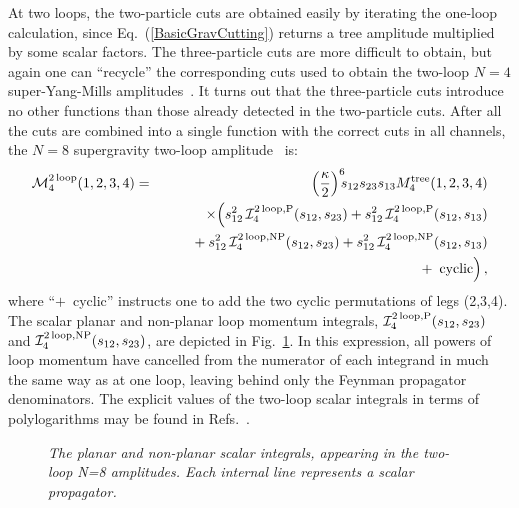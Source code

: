 \documentclass[12pt]{livrev}
\begin{document}
At two loops, the two-particle cuts are obtained easily by
iterating the one-loop calculation, since Eq.~(\ref{BasicGravCutting})
returns a tree amplitude multiplied by some scalar factors. The
three-particle cuts are more difficult to obtain, but again one can
``recycle'' the corresponding cuts used to obtain the two-loop $N=4$
super-Yang-Mills amplitudes~\cite{BRY}.  It turns out that the
three-particle cuts introduce no other functions than those already
detected in the two-particle cuts.  After all the cuts are combined into a
single function with the correct cuts in all channels, the $N=8$
supergravity two-loop amplitude~\cite{BDDPR} is:
%
\begin{eqnarray}
{\cal M}_4^{{\rm 2\,loop}}(1,2,3,4) & = &
  \Bigl({\kappa \over 2} \Bigr)^6 \!\! s_{12} s_{23} s_{13}
  M_4^{\rm tree}(1,2,3,4) \nonumber\\
&& \hskip .3 cm \times
\Bigl( s_{12}^2 \, {\cal I}_4^{{\rm 2\, loop},{\rm P}}(s_{12},s_{23}) 
+ s_{12}^2 \, {\cal I}_4^{{\rm 2\, loop},{\rm P}}(s_{12},s_{13}) \nonumber \\
& & \null \hskip  .7 cm  
+ s_{12}^2 \, {\cal I}_4^{{\rm 2\, loop},{\rm NP}}(s_{12},s_{23})
+ s_{12}^2 \, {\cal I}_4^{{\rm 2\, loop},{\rm NP}}(s_{12},s_{13}) \nonumber \\
& & \null \hskip  3 cm  
+\;  \hbox{cyclic} \Bigr) \,, 
\label{TwoLoopAmplitude}
\end{eqnarray}
%
where ``$+$~cyclic'' instructs one to add the two cyclic permutations of
legs (2,3,4). The scalar planar and non-planar loop momentum integrals, ${\cal
I}_4^{{\rm 2\,loop},{\rm P}}(s_{12}, s_{23})$ 
and ${\cal I}_4^{{\rm 2\,loop},{\rm
NP}}(s_{12}, s_{23})$, are depicted in 
Fig.~\ref{figure:PlanarNonPlanar}.  In this
expression, all powers of loop momentum have cancelled from the
numerator of each integrand in much the same way as at one loop,
leaving behind only the Feynman propagator denominators.  The explicit
values of the two-loop scalar integrals in terms of polylogarithms may
be found in Refs.~\cite{Smirnov99,Tausk99}.

\begin{figure}[h]
  \def\epsfsize#1#2{0.5#1}
  \centerline{}
  \caption{\it The planar and non-planar scalar integrals, 
   appearing in the two-loop N=8 amplitudes.
   Each internal line represents a scalar propagator.}
  \label{figure:PlanarNonPlanar}
\end{figure}
\end{document}
